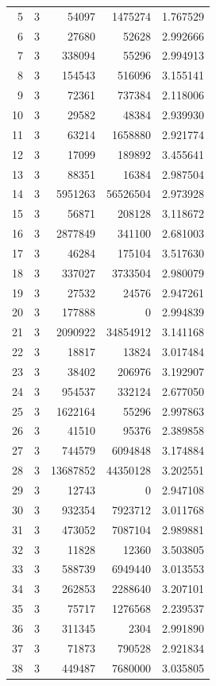 \begin{longtable}{rrrrr}
5 & 3 & 54097 & 1475274 & 1.767529\\
6 & 3 & 27680 & 52628 & 2.992666\\
7 & 3 & 338094 & 55296 & 2.994913\\
8 & 3 & 154543 & 516096 & 3.155141\\
9 & 3 & 72361 & 737384 & 2.118006\\
10 & 3 & 29582 & 48384 & 2.939930\\
11 & 3 & 63214 & 1658880 & 2.921774\\
12 & 3 & 17099 & 189892 & 3.455641\\
13 & 3 & 88351 & 16384 & 2.987504\\
14 & 3 & 5951263 & 56526504 & 2.973928\\
15 & 3 & 56871 & 208128 & 3.118672\\
16 & 3 & 2877849 & 341100 & 2.681003\\
17 & 3 & 46284 & 175104 & 3.517630\\
18 & 3 & 337027 & 3733504 & 2.980079\\
19 & 3 & 27532 & 24576 & 2.947261\\
20 & 3 & 177888 & 0 & 2.994839\\
21 & 3 & 2090922 & 34854912 & 3.141168\\
22 & 3 & 18817 & 13824 & 3.017484\\
23 & 3 & 38402 & 206976 & 3.192907\\
24 & 3 & 954537 & 332124 & 2.677050\\
25 & 3 & 1622164 & 55296 & 2.997863\\
26 & 3 & 41510 & 95376 & 2.389858\\
27 & 3 & 744579 & 6094848 & 3.174884\\
28 & 3 & 13687852 & 44350128 & 3.202551\\
29 & 3 & 12743 & 0 & 2.947108\\
30 & 3 & 932354 & 7923712 & 3.011768\\
31 & 3 & 473052 & 7087104 & 2.989881\\
32 & 3 & 11828 & 12360 & 3.503805\\
33 & 3 & 588739 & 6949440 & 3.013553\\
34 & 3 & 262853 & 2288640 & 3.207101\\
35 & 3 & 75717 & 1276568 & 2.239537\\
36 & 3 & 311345 & 2304 & 2.991890\\
37 & 3 & 71873 & 790528 & 2.921834\\
38 & 3 & 449487 & 7680000 & 3.035805\\

\end{longtable}
